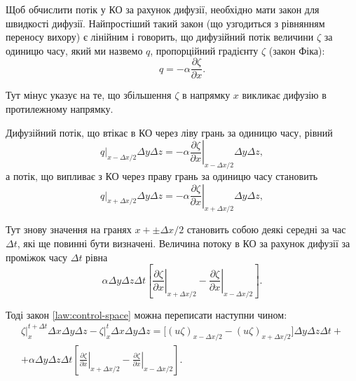Щоб обчислити потік у КО за рахунок дифузії, необхідно мати закон для швидкості дифузії. Найпростіший такий закон (що узгодиться з рівнянням переносу вихору) є лінійним і говорить, що дифузійний потік величини $\zeta$ за одиницю часу, який ми назвемо $q$, пропорційний градієнту $\zeta$ (закон Фіка):
\begin{equation*}
    q = - \alpha \frac{\partial \zeta}{\partial x}.
\end{equation*}

Тут мінус указує на те, що збільшення $\zeta$ в напрямку $x$ викликає дифузію в протилежному напрямку. \medskip

Дифузійний потік, що втікає в КО через ліву грань за одиницю часу, рівний
\begin{equation*}
    \left. q \right|_{x - \Delta x / 2} \Delta y \Delta z = - \alpha \left. \frac{\partial \zeta}{\partial x} \right|_{x - \Delta x / 2} \Delta y \Delta z,
\end{equation*}
а потік, що випливає з КО через праву грань за одиницю часу становить
\begin{equation*}
    \left. q \right|_{x + \Delta x / 2} \Delta y \Delta z = - \alpha \left. \frac{\partial \zeta}{\partial x} \right|_{x + \Delta x / 2} \Delta y \Delta z,
\end{equation*}
 
Тут знову значення на гранях $x + \pm \Delta x / 2$ становить собою деякі середні за час $\Delta t$, які ще повинні бути визначені. Величина потоку в КО за рахунок дифузії за проміжок часу $\Delta t$ рівна
\begin{equation*}
    \alpha \Delta y \Delta z \Delta t \left[ \left. \frac{\partial \zeta}{\partial x} \right|_{x + \Delta x / 2} - \left. \frac{\partial \zeta}{\partial x} \right|_{x - \Delta x / 2} \right].
\end{equation*}
 
Тоді закон \ref{law:control-space} можна переписати наступни чином:
\begin{multline}
    \label{eq:2.32}
    \left. \zeta \right|_x^{t + \Delta t} \Delta x \Delta y \Delta z - \left. \zeta \right|_x^t \Delta x \Delta y \Delta z = \Big[ (u \zeta)_{x - \Delta x / 2} - (u \zeta)_{x + \Delta x / 2} \Big] \Delta y \Delta z \Delta t + \\ + \alpha \Delta y \Delta z \Delta t \left[ \left. \frac{\partial \zeta}{\partial x} \right|_{x + \Delta x / 2} - \left. \frac{\partial \zeta}{\partial x} \right|_{x - \Delta x / 2} \right].
\end{multline}

